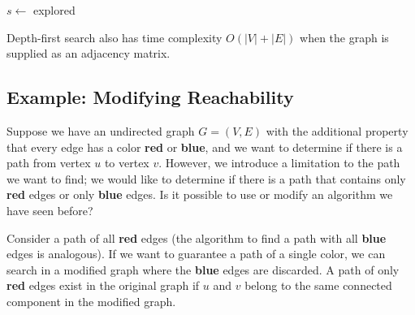 \documentclass[11pt]{article}
\begin{document}
\IncMargin{2em}
\begin{algorithm}[H]
    \footnotesize
    \DontPrintSemicolon
    \BlankLine

    \BlankLine \BlankLine
     {
        $s \gets$ explored \; 
        \BlankLine \BlankLine 
    }
\end{algorithm}\DecMargin{2em} 

Depth-first search also has time complexity $O(|V| + |E|)$ when the graph is supplied as an adjacency matrix.

\subsection{Example: Modifying Reachability}
Suppose we have an undirected graph $G = (V, E)$ with the additional property that every edge has a color \textcolor{Maroon0}{\textbf{red}} or \textcolor{DeepSkyBlue3}{\textbf{blue}}, and we want to determine if there is a path from vertex $u$ to vertex $v$. However, we introduce a limitation to the path we want to find; we would like to determine if there is a path that contains only \textcolor{Maroon0}{\textbf{red}} edges or only \textcolor{DeepSkyBlue3}{\textbf{blue}} edges. Is it possible to use or modify an algorithm we have seen before?

Consider a path of all \textcolor{Maroon0}{\textbf{red}} edges (the algorithm to find a path with all \textcolor{DeepSkyBlue3}{\textbf{blue}} edges is analogous). If we want to guarantee a path of a single color, we can search in a modified graph where the \textcolor{DeepSkyBlue3}{\textbf{blue}} edges are discarded. A path of only \textcolor{Maroon0}{\textbf{red}} edges exist in the original graph if $u$ and $v$ belong to the same connected component in the modified graph. 
\end{document}
